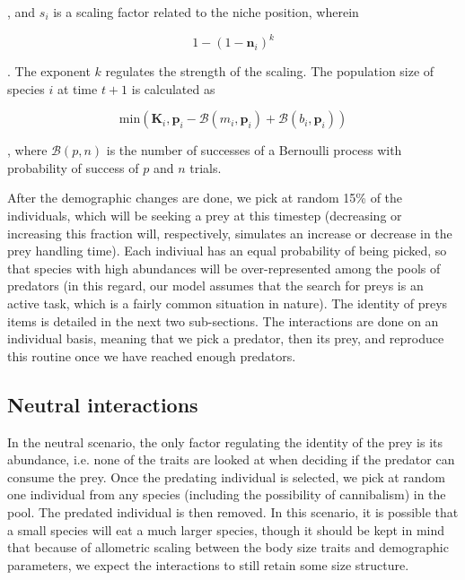 \documentclass[10pt,twocolumn,fleqn]{article}
\begin{document}
\noindent, and $s_i$ is a scaling factor related to the niche position, wherein

\begin{equation}
	1-(1-\mathbf{n}_i)^k
\end{equation}

\noindent. The exponent $k$ regulates the strength of the scaling. The
population size of species $i$ at time $t+1$ is calculated as

\begin{equation}
	\mathrm{min}(\mathbf{K}_i, \mathbf{p}_i - \mathcal{B}(m_i, \mathbf{p}_i) + \mathcal{B}(b_i, \mathbf{p}_i))
\end{equation}

\noindent, where $\mathcal{B}(p,n)$ is the number of successes of a Bernoulli
process with probability of success of $p$ and $n$ trials.

After the demographic changes are done, we pick at random 15\% of the
individuals, which will be seeking a prey at this timestep (decreasing or
increasing this fraction will, respectively, simulates an increase or decrease
in the prey handling time). Each indiviual has an equal probability of being
picked, so that species with high abundances will be over-represented among the
pools of predators (in this regard, our model assumes that the search for preys
is an active task, which is a fairly common situation in nature). The identity
of preys items is detailed in the next two sub-sections. The interactions are
done on an individual basis, meaning that we pick a predator, then its prey, and
reproduce this routine once we have reached enough predators.

\subsection{Neutral interactions}

In the neutral scenario, the only factor regulating the identity of the prey
is its abundance, i.e. none of the traits are looked at when deciding if the
predator can consume the prey. Once the predating individual is selected, we pick at random
one individual from any species (including the possibility of cannibalism) in
the pool. The predated individual is then removed. In this scenario, it is
possible that a small species will eat a much larger species, though it should
be kept in mind that because of allometric scaling between the body size traits
and demographic parameters, we expect the interactions to still retain some size
structure.
\end{document}
